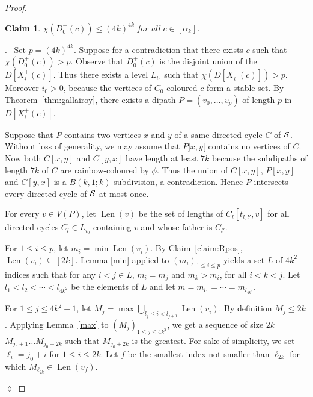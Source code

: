 \documentclass[utf8,10pt]{article}
\theoremstyle{plain}
\newtheorem{claim}{Claim}[theorem]
\theoremstyle{definition}
\theoremstyle{remark}
\newenvironment{subproof}{\par\noindent {\it Subproof}.\ }{\hfill$\lozenge$\par\vspace{11pt}}
\DeclareMathOperator{\Len}{Len}
\begin{document}
\begin{proof}
\begin{claim}\label{claim:D0}
$\chi(D^+_0(c))\leq (4k)^{4k}$ for all $c\in [\alpha_k]$. 
\end{claim}
\begin{subproof}
Set $p=(4k)^{4k}$.
Suppose for a contradiction that there exists $c$ such that $\chi(D^+_0(c)) > p$. 
Observe that $D^+_0(c)$ is the disjoint union of the $D[X^+_i(c)]$. Thus there exists a level $L_{i_0}$ such that $\chi(D[X^+_i(c)]) >p$.
Moreover $i_0>0$, because the vertices of $C_0$ coloured $c$ form a stable set.
 By Theorem~\ref{thm:gallairoy}, there exists a dipath $P=(v_0,  \dots , v_{p})$ of length $p$ in $D[X^+_i(c)]$.



Suppose that $P$ contains two vertices $x$ and $y$ of a same directed cycle $C$ of ${\cal S}$. 
Without loss of generality, we may assume that $P]x,y[$ contains no vertices of $C$.
Now  both $C[x,y]$ and $C[y,x]$ have length at least $7k$ because the subdipaths of  length $7k$ of $C$ are rainbow-coloured by $\phi$. 
Thus the union of $C[x,y]$, $P[x,y]$ and $C[y,x]$ is a $B(k,1;k)$-subdivision, a contradiction.
Hence $P$ intersects every directed cycle of ${\cal S}$ at most once.



\medskip


For every $v\in V(P)$, let $\Len(v)$ be the set of lengths of $C_l[t_{l,l'},v]$ for all directed cycles $C_l \in  L_{i_0}$ containing $v$ and whose father is $C_{l'}$.


For $1\leq i\leq p$, let $m_i = \min \Len(v_i)$. By Claim~\ref{claim:Rpos}, $\Len(v_i) \subseteq [2k]$.
Lemma \ref{min} applied to $(m_i)_{1\leq i\leq p}$ yields a set $L$ of $4k^2$ indices such that 
for any $i< j \in L$,  $m_i=m_j$ and $m_k > m_i$, for all $i< k < j$.
Let $l_1 < l_2 < \cdots < l_{4k^2}$ be the elements of $L$ and let $m= m_{l_1} = \cdots = m_{l_{4k^2}}$.


For $1\leq j\leq 4k^2-1$, let $M_j = \max \bigcup_{l_j\leq i < l_{j+1}} \Len(v_i)$.
By definition $M_j\leq 2k$.
Applying Lemma~\ref{max} to $(M_j)_{1\leq j\leq 4k^2}$,  we get a sequence of size $2k$ $M_{j_0+1} \dots M_{j_0+{2k}}$ such that $M_{j_0+{2k}}$ is the greatest. 
For sake of simplicity, we set $\ell_i =j_0+i$ for $1\leq i\leq 2k$.
Let $f$ be  the smallest index not smaller than $\ell_{2k}$ for which $M_{\ell_{2k}} \in \Len (v_f)$. 


\end{subproof}
\end{proof}
\end{document}
